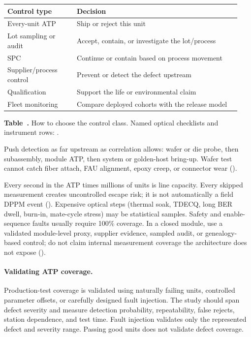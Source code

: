 \begin{table}[ht]
\label{tab:mfg-control-types}%
\centering
\setlength{\tabcolsep}{3pt}%
\footnotesize
\renewcommand{\arraystretch}{1.2}%
\begin{tabular}{@{}p{0.28\linewidth}p{0.66\linewidth}@{}}
\toprule
Control type & Decision \\
\midrule
Every-unit ATP & Ship or reject this unit \\
\addlinespace[0.6em]
Lot sampling or audit & Accept, contain, or investigate the lot/process \\
\addlinespace[0.6em]
SPC & Continue or contain based on process movement \\
\addlinespace[0.6em]
Supplier/process control & Prevent or detect the defect upstream \\
\addlinespace[0.6em]
Qualification & Support the life or environmental claim \\
\addlinespace[0.6em]
Fleet monitoring & Compare deployed cohorts with the release model \\
\bottomrule
\end{tabular}
\par\medskip
{\raggedright\footnotesize\textbf{Table~\thetable.} How to choose the control
class. Named optical checklists and instrument rows:
.\par}
\end{table}
\FloatBarrier

Push detection as far upstream as correlation allows: wafer or die probe, then
subassembly, module ATP, then system or golden-host bring-up. Wafer test cannot
catch fiber attach, FAU alignment, epoxy creep, or connector wear
().

Every second in the ATP times millions of units is line capacity. Every skipped
measurement creates uncontrolled escape risk; it is not automatically a field
DPPM event (). Expensive optical steps (thermal soak, TDECQ,
long BER dwell, burn-in, mate-cycle stress) may be statistical samples. Safety
and enable-sequence faults usually require 100\% coverage. In a closed module,
use a validated module-level proxy, supplier evidence, sampled audit, or
genealogy-based control; do not claim internal measurement coverage the
architecture does not expose
().

\paragraph{Validating ATP coverage.}
Production-test coverage is validated using naturally failing units, controlled
parameter offsets, or carefully designed fault injection. The study should span
defect severity and measure detection probability, repeatability, false rejects,
station dependence, and test time. Fault injection validates only the
represented defect and severity range. Passing good units does not validate
defect coverage.

